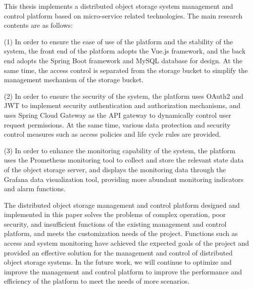 \begin{abstract*}
  This thesis implements a distributed object storage system management and control platform based on micro-service related technologies. The main research contents 
  are as follows:
  
  (1) In order to ensure the ease of use of the platform and the stability of the system, the front end of the platform adopts the Vue.js framework,
   and the back end adopts the Spring Boot framework and MySQL database for design. At the same time, the access control is separated from the 
   storage bucket to simplify the management mechanism of the storage bucket.
  
  (2) In order to ensure the security of the system, the platform uses OAuth2 and JWT to implement security authentication and authorization 
  mechanisms, and uses Spring Cloud Gateway as the API gateway to dynamically control user request permissions. At the same time, various data 
  protection and security control measures such as access policies and life cycle rules are provided.
  
  (3) In order to enhance the monitoring capability of the system, the platform uses the Prometheus monitoring tool to collect and store the 
  relevant state data of the object storage server, and displays the monitoring data through the Grafana data visualization tool, providing more 
  abundant monitoring indicators and alarm functions.
  
  The distributed object storage management and control platform designed and implemented in this paper solves the problems of complex operation, poor security, and 
  insufficient functions of the existing management and control platform, and meets the customization needs of the project. Functions such as access and system 
  monitoring have achieved the expected goals of the project and provided an effective solution for the management and control of distributed object storage systems. 
  In the future work, we will continue to optimize and improve the management and control platform to improve the performance and efficiency of the platform to meet 
  the needs of more scenarios.
\end{abstract*}
